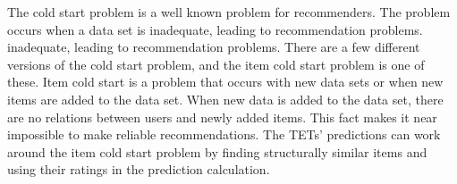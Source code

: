 The cold start problem is a well known problem for recommenders\cite{Ricci2015}\cite{saveski2014item}.
The problem occurs when a data set is inadequate, leading to recommendation problems.
inadequate, leading to recommendation problems.
There are a few different versions of the cold start problem, and the item cold start problem is one of these. 
Item cold start is a problem that occurs with new data sets or when new items are added to the data set.
When new data is added to the data set, there are no relations between users and newly added items.
This fact makes it near impossible to make reliable recommendations.
The TETs' predictions can work around the item cold start problem by finding structurally similar items and using their ratings in the prediction calculation.
